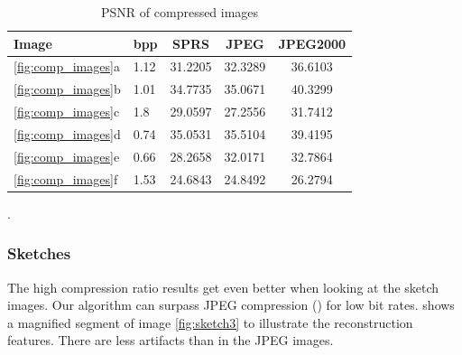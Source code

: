 \begin{table}[h]
\centering

\begin{tabular}{| l l | c | c | c|}
\hline\hline
Image & bpp & SPRS & JPEG & JPEG2000 \\
\hline
\ref{fig:comp_images}a & 1.12 & 31.2205 & 32.3289 & 36.6103 \\
\hline
\ref{fig:comp_images}b & 1.01 & 34.7735 & 35.0671 & 40.3299 \\
\hline
\ref{fig:comp_images}c & 1.8  & 29.0597 & 27.2556 & 31.7412 \\
\hline
\ref{fig:comp_images}d & 0.74 & 35.0531 & 35.5104 & 39.4195 \\
\hline
\ref{fig:comp_images}e & 0.66 & 28.2658 & 32.0171 & 32.7864 \\
\hline
\ref{fig:comp_images}f & 1.53 & 24.6843  & 24.8492 & 26.2794 \\
\hline
\end{tabular}
\caption{PSNR of compressed images}
\label{tab:compression1}.
\end{table} 


\subsubsection{Sketches}
The high compression ratio results get even better when looking at the sketch
images. Our algorithm can surpass JPEG
compression () for low bit rates.
 shows a magnified segment of image
\ref{fig:sketch3} to illustrate the reconstruction features. There are less
artifacts than in the JPEG images. 

